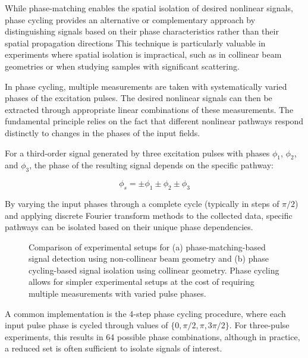 \noindent 
While phase-matching enables the spatial isolation of desired nonlinear signals, phase cycling provides an alternative or complementary approach by distinguishing signals based on their phase characteristics rather than their spatial propagation directions %
This technique is particularly valuable in experiments where spatial isolation is impractical, such as in collinear beam geometries or when studying samples with significant scattering.

\noindent 
In phase cycling, multiple measurements are taken with systematically varied phases of the excitation pulses. The desired nonlinear signals can then be extracted through appropriate linear combinations of these measurements. The fundamental principle relies on the fact that different nonlinear pathways respond distinctly to changes in the phases of the input fields.

\noindent 
For a third-order signal generated by three excitation pulses with phases $\phi_1$, $\phi_2$, and $\phi_3$, the phase of the resulting signal depends on the specific pathway:

\begin{equation}
	\phi_s = \pm\phi_1 \pm\phi_2 \pm\phi_3
	\label{eq:phase_cycling}
\end{equation}

\noindent 
By varying the input phases through a complete cycle (typically in steps of $\pi/2$) and applying discrete Fourier transform methods to the collected data, specific pathways can be isolated based on their unique phase dependencies.

\begin{figure}[ht]
	\centering
	\caption{Comparison of experimental setups for (a) phase-matching-based signal detection using non-collinear beam geometry and (b) phase cycling-based signal isolation using collinear geometry. Phase cycling allows for simpler experimental setups at the cost of requiring multiple measurements with varied pulse phases.}
	\label{fig:phase_cycling_vs_matching}
\end{figure}

\noindent 
A common implementation is the 4-step phase cycling procedure, where each input pulse phase is cycled through values of $\{0, \pi/2, \pi, 3\pi/2\}$. For three-pulse experiments, this results in 64 possible phase combinations, although in practice, a reduced set is often sufficient to isolate signals of interest.

